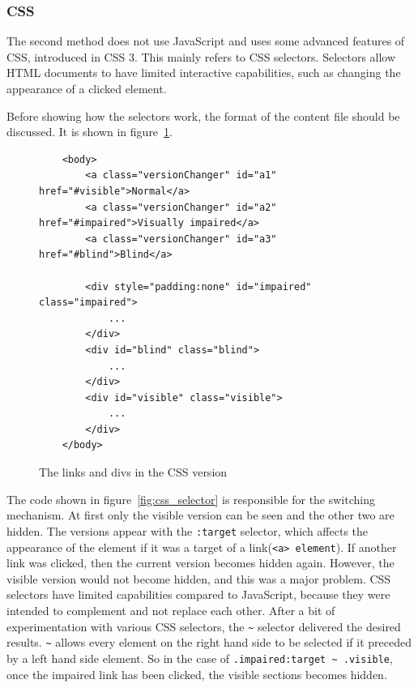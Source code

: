 \subsubsection{CSS}
The second method does not use JavaScript and uses some advanced features of CSS, introduced in CSS 3. This mainly refers to CSS selectors. Selectors allow HTML documents to have limited interactive capabilities, such as changing the appearance of a clicked element.\cite{cssSelectors} 

Before showing how the selectors work, the format of the content file should be discussed. It is shown in figure~\ref{fig:css_switch}. 
\begin{figure}
	
	\begin{lstlisting}
	<body>
		<a class="versionChanger" id="a1" href="#visible">Normal</a>
		<a class="versionChanger" id="a2" href="#impaired">Visually impaired</a>
		<a class="versionChanger" id="a3" href="#blind">Blind</a>
		
		<div style="padding:none" id="impaired" class="impaired">
			...
		</div>
		<div id="blind" class="blind">
			...
		</div>
		<div id="visible" class="visible">
			...
		</div>
	</body>
	\end{lstlisting}
	\caption{The links and divs in the CSS version}
	\label{fig:css_switch}
\end{figure}

The code shown in figure~\ref{fig:css_selector} is responsible for the switching mechanism. At first only the visible version can be seen and the other two are hidden. The versions appear with the \lstinline|:target| selector, which affects the appearance of the element if it was a target of a link(\lstinline|<a> element|). If another link was clicked, then the current version becomes hidden again. However, the visible version would not become hidden, and this was a major problem. CSS selectors have limited capabilities compared to JavaScript, because they were intended to complement and not replace each other. After a bit of experimentation with various CSS selectors, the \lstinline|~| selector delivered the desired results. \lstinline|~| allows every element on the right hand side to be selected if it preceded by a left hand side element. So in the case of \lstinline|.impaired:target ~ .visible|, once the impaired link has been clicked, the visible sections becomes hidden.


